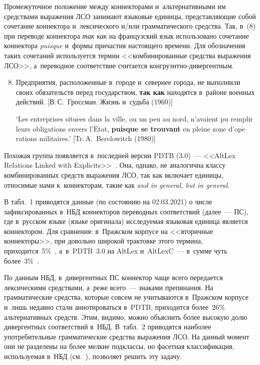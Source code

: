 \begin{multicols}{2}
Промежуточное положение между коннекторами и~альтернативными им 
средствами выражения ЛСО занимают языковые единицы, пред\-став\-ля\-ющие 
собой сочетание коннектора и~лексического и/или грамматического средства. 
Так, в~(8) при переводе коннектора \textit{так как} на французский язык\linebreak 
использовано сочетание коннектора \textit{puisque} и~формы причастия 
настоящего времени. Для обо\-значения таких сочетаний используется термин 
<<комбинированные средства выражения ЛСО>>, а~переводное 
соответствие считается кон\-гру\-энт\-но-ди\-вер\-гент\-ным.
{\small
\begin{enumerate}[(1)]
\setcounter{enumi}{7}
\item Предприятия, расположенные в~городе и~севернее города, не выполнили своих 
обязательств перед государством, \textbf{так как} находятся в~районе военных 
действий. [В.\,С.~Гроссман. Жизнь и~судьба (1960)]

`Les entreprises situ$\acute{\mbox{e}}$es dans la ville, ou un peu au nord, n'avaient pu 
remplir leurs obligations envers l'$\acute{\mbox{E}}$tat, \textbf{puisque se trouvant} en 
pleine zone d'op$\acute{\mbox{e}}$rations militaires.' [Tr.\,A.~Berelowitch (1980)]
\end{enumerate}
}

Похожая группа появляется в~последней версии PDTB (3.0)~--- <<AltLex 
Relations Linked with Explicits>>~\cite[с.~80]{14-in}. Она, однако, не 
аналогична классу комбинированных средств выражения ЛСО, так как 
включает единицы, относимые нами к~коннекторам, такие как \textit{and in 
general, but in general}.

В табл.~1 приводятся данные (по состоянию на 02.03.2021) о числе 
зафиксированных в~НБД коннекторов переводных соответствий (далее~--- 
ПС), где в~русском языке (языке оригинала) исследуемая языковая единица 
является коннектором. Для сравнения: в~Пражском корпусе на <<вторичные 
коннекторы>>, при довольно широкой трактовке этого термина, 
приходится~5\%~\cite[с.~456]{12-in}, а~в~PDTB~3.0 на AltLex и~AltLexC~--- 
в~сумме чуть более~3\%~\cite[с.~5]{14-in}.
{

}


По данным НБД, в~дивергентных ПС коннектор чаще всего передается 
лексическими средствами, а~реже всего~--- знаками препинания. На 
грамматические средства, которые совсем не учитываются в~Пражском 
корпусе и~лишь недавно стали аннотироваться в~PDTB, приходится 
более~26\% альтернативных средств. Этим, видимо, можно объяснить более 
высокую долю дивергентных соответствий в~НБД. В~табл.~2 приводятся 
наиболее употребительные грамматические средства выражения ЛСО. На 
данный момент они не разделены на более мелкие подклассы, но фасетная 
классификация, используемая в~НБД (см.~\cite{18-in}), позволяет решить эту 
задачу.
{

}
\end{multicols}
